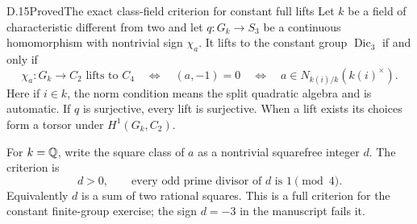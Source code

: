 \begin{statement}{D.15}{Proved}{The exact class-field criterion for constant full lifts}
Let \(k\) be a field of characteristic different from two and
let \(q:G_k\to S_3\) be a continuous homomorphism with
nontrivial sign \(\chi_a\).  It lifts to the constant group
\(\operatorname{Dic}_3\) if and only if
\[
 \chi_a:G_k\to C_2\text{ lifts to }C_4
 \quad\Longleftrightarrow\quad
 (a,-1)=0
 \quad\Longleftrightarrow\quad
 a\in N_{k(i)/k}(k(i)^\times).
 \tag{D.29}
\]
Here if \(i\in k\), the norm condition means the split
quadratic algebra and is automatic.
If \(q\) is surjective, every lift is surjective.
When a lift exists its choices form a torsor under
\(H^1(G_k,C_2)\).

For \(k=\mathbb Q\), write the square class of \(a\) as a nontrivial
squarefree integer \(d\).  The criterion is
\[
 d>0,\qquad
 \text{every odd prime divisor of \(d\) is }1\pmod4 .
 \tag{D.30}
\]
Equivalently \(d\) is a sum of two rational squares.
This is a full criterion for the constant finite-group exercise;
the sign \(d=-3\) in the manuscript fails it.
\end{statement}
